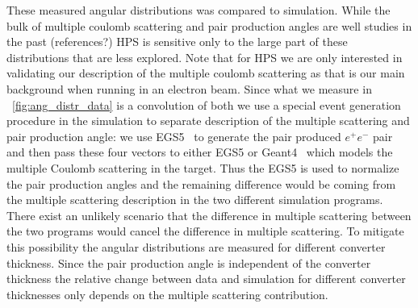 These measured angular distributions was compared to simulation. 
While the bulk of multiple coulomb scattering and pair production angles 
are well studies in the past {\color{red} (references?)} HPS 
is sensitive only to the large part of these distributions that are less explored. 
Note that for HPS 
we are only interested in validating our description of the multiple coulomb scattering as that 
is our main background when running in an electron beam. Since 
what we measure in ~\ref{fig:ang_distr_data} is a convolution of both we use a special event 
generation procedure in the simulation to separate description of the multiple scattering and 
pair production angle: we use EGS5~\cite{egs5} to generate the pair produced $e^+e^-$ pair 
and then pass these four vectors to either {\sc EGS5} or {\sc Geant4}~\cite{geant4} which 
models the multiple Coulomb scattering in the target. Thus the {\sc EGS5} is used to normalize 
the pair production angles and the remaining difference would be coming from the 
multiple scattering description in the two different simulation programs. There exist an unlikely 
scenario that the difference in multiple scattering between the two programs would cancel the difference in multiple scattering. To mitigate this possibility the angular distributions are 
measured for different converter thickness. Since the pair production angle is independent of 
the converter thickness the relative change between data and simulation for different converter thicknesses only depends on the multiple scattering contribution. 

